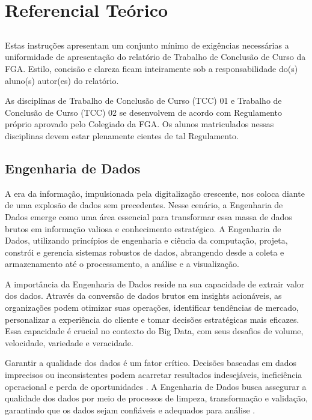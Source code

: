 
\chapter[Referencial Teórico]{Referencial Teórico}



\section{}
Estas instruções apresentam um conjunto mínimo de exigências necessárias a 
uniformidade de apresentação do relatório de Trabalho de Conclusão de Curso 
da FGA. Estilo, concisão e clareza ficam inteiramente sob a 
responsabilidade do(s) aluno(s) autor(es) do relatório.

As disciplinas de Trabalho de Conclusão de Curso (TCC) 01 e Trabalho de 
Conclusão de Curso (TCC) 02 se desenvolvem de acordo com Regulamento 
próprio aprovado pelo Colegiado da FGA. Os alunos matriculados nessas 
disciplinas devem estar plenamente cientes de tal Regulamento.

\section{Engenharia de Dados}

A era da informação, impulsionada pela digitalização crescente, nos coloca diante de uma explosão 
de dados sem precedentes. Nesse cenário, a Engenharia de Dados emerge como uma área essencial
para transformar essa massa de dados brutos em informação valiosa e conhecimento estratégico. A 
Engenharia de Dados, utilizando princípios de engenharia e ciência da computação, projeta, constrói 
e gerencia sistemas robustos de dados, abrangendo desde a coleta e armazenamento até o processamento, a análise e a visualização.

A importância da Engenharia de Dados reside na sua capacidade de extrair valor dos dados. Através 
da conversão de dados brutos em insights acionáveis, as organizações podem otimizar suas operações, 
identificar tendências de mercado, personalizar a experiência do cliente e tomar decisões estratégicas 
mais eficazes. Essa capacidade é crucial no contexto do Big Data, com seus desafios de volume, 
velocidade, variedade e veracidade.

Garantir a qualidade dos dados é um fator crítico. Decisões baseadas em dados imprecisos ou 
inconsistentes podem acarretar resultados indesejáveis, ineficiência operacional e perda de 
oportunidades \cite{impact_poor_data_1998}. A Engenharia de Dados busca assegurar a qualidade dos dados por meio de processos 
de limpeza, transformação e validação, garantindo que os dados sejam confiáveis e adequados para análise \cite{haug2011costs}.

